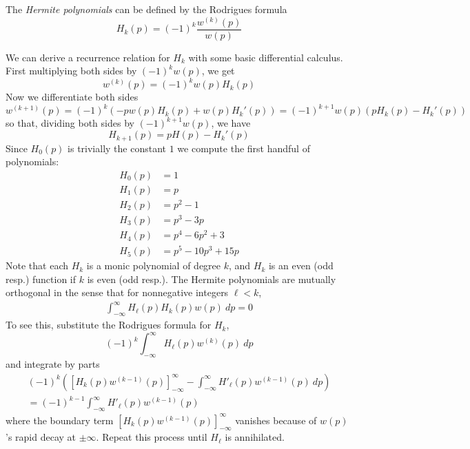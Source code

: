 
\begin{definition}
  The \emph{Hermite polynomials} can be defined by the Rodrigues formula
  \[
      H_k(p) = {(-1)}^k \frac{w^{(k)}(p)}{w(p)}
  \]
  
\end{definition}

We can derive a recurrence relation for $H_k$ with some basic differential calculus. First multiplying both sides by $(-1)^k w(p)$, we get
\[
   w^{(k)}(p) = {(-1)}^k w(p)H_k(p)
\]
Now we differentiate both sides 
\[
  w^{(k+1)}(p) 
    = {(-1)}^{k} (-pw(p)H_k(p) + w(p)H_k'(p)) 
    = {(-1)}^{k+1} w(p)(pH_k(p) - H_k'(p))
\]
so that, dividing both sides by ${(-1)}^{k+1} w(p)$, we have
\[
  H_{k+1}(p) = pH(p) - H_k'(p)
\]
Since $H_0(p)$ is trivially the constant $1$ we compute the first handful of polynomials:
\begin{align*}
  H_0(p) &= 1 \\
  H_1(p) &= p \\
  H_2(p) &= p^2 - 1 \\
  H_3(p) &= p^3 - 3p \\
  H_4(p) &= p^4 - 6p^2 + 3 \\
  H_5(p) &= p^5 - 10p^3 + 15p
\end{align*}
Note that each $H_k$ is a monic polynomial of  degree $k$, and $H_k$ is an even (odd resp.) function if $k$ is even (odd resp.).
The Hermite polynomials are mutually orthogonal in the sense that for nonnegative integers $\ell < k$,
\begin{align}\label{eq:HOrth}
  \int_{-\infty}^\infty H_\ell(p) H_k(p) w(p)~dp 
  = 0
\end{align}
To see this, substitute the Rodrigues formula for $H_k$,
\[
  (-1)^k \int_{-\infty}^\infty H_\ell(p) w^{(k)}(p)~dp
\]
and integrate by parts
\begin{align*}
  (-1)^k \left(\left[H_k(p)w^{(k-1)}(p)\right]_{-\infty}^\infty - \int_{-\infty}^\infty H'_\ell(p) w^{(k-1)}(p)~dp\right) \\
  = (-1)^{k-1}\int_{-\infty}^\infty H'_\ell(p) w^{(k-1)}(p)
\end{align*}
where the boundary term $\left[H_k(p)w^{(k-1)}(p)\right]_{-\infty}^\infty$ vanishes because of $w(p)$'s rapid decay at $\pm \infty$. Repeat this process until $H_\ell$ is annihilated.

